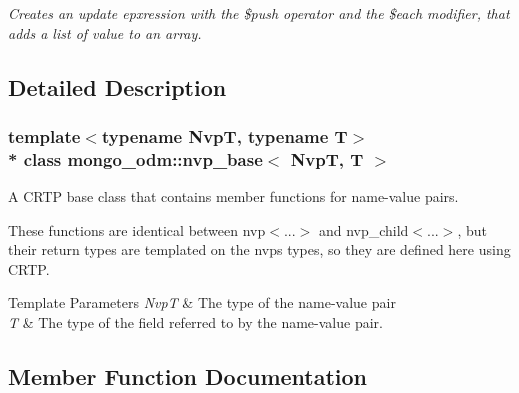 \begin{DoxyCompactItemize}
\begin{DoxyCompactList}\small\item\em Creates an update epxression with the \$push operator and the \$each modifier, that adds a list of value to an array. \end{DoxyCompactList}\end{DoxyCompactItemize}


\subsection{Detailed Description}
\subsubsection*{template$<$typename NvpT, typename T$>$\\*
class mongo\+\_\+odm\+::nvp\+\_\+base$<$ Nvp\+T, T $>$}

A C\+R\+TP base class that contains member functions for name-\/value pairs. 

These functions are identical between nvp$<$...$>$ and nvp\+\_\+child$<$...$>$, but their return types are templated on the nvp\textquotesingle{}s types, so they are defined here using C\+R\+TP. 
\begin{DoxyTemplParams}{Template Parameters}
{\em NvpT} & The type of the name-\/value pair \\
\hline
{\em T} & The type of the field referred to by the name-\/value pair. \\
\hline
\end{DoxyTemplParams}


\subsection{Member Function Documentation}
